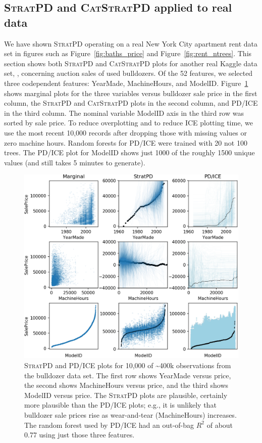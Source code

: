 \documentclass[12pt]{article}
\newcommand{\figref}[1]{Figure~\ref{#1}}
\newcommand{\spd}{\fontfamily{cmr}\textsc{\small StratPD}}
\newcommand{\cspd}{\fontfamily{cmr}\textsc{\small CatStratPD}}
\begin{document}
\subsection{\spd{} and \cspd{} applied to real data} 

We have shown \spd{} operating on a real New York City apartment rent data set in figures such as \figref{fig:baths_price} and \figref{fig:rent_ntrees}.  This section shows both \spd{} and \cspd{} plots for another real Kaggle data set, \cite{bulldozer}, concerning auction sales of used bulldozers.  Of the 52 features, we selected three codependent features: YearMade, MachineHours, and ModelID. \figref{fig:bulldozer} shows marginal plots for the three variables versus bulldozer sale price in the first column, the \spd{} and \cspd{} plots in the second column, and PD/ICE in the third column. The nominal variable ModelID axis in the third row was sorted by sale price. To reduce overplotting and to reduce ICE plotting time, we use the most recent 10,000 records after dropping those with missing values or zero machine hours. Random forests for PD/ICE were trained with 20 not 100 trees. The  PD/ICE plot for ModelID shows just 1000 of the roughly 1500 unique values (and still takes 5 minutes to generate).

\begin{figure}[htbp]
\begin{center}
\includegraphics[scale=0.7]{images/bulldozer.png}
\caption{\spd{} and PD/ICE plots for 10,000 of \textasciitilde400k observations from the bulldozer data set. The first row shows YearMade versus price, the second shows MachineHours versus price, and the third shows ModelID versus price. The \spd{} plots are plausible, certainly more plausible than the PD/ICE plots; e.g., it is unlikely that bulldozer sale prices rise as wear-and-tear (MachineHours) increases. The random forest used by PD/ICE had an out-of-bag $R^2$ of about 0.77 using just those three features.}
\label{fig:bulldozer}
\end{center}
\end{figure}
\end{document}
